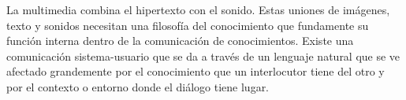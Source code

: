 La multimedia combina el hipertexto con el sonido. Estas uniones de imágenes, texto y sonidos necesitan una filosofía del conocimiento que fundamente su función interna dentro de la comunicación de conocimientos. Existe una comunicación sistema-usuario que se da a través de un lenguaje natural que se ve afectado grandemente por el conocimiento que un interlocutor tiene del otro y por el contexto o entorno donde el diálogo tiene lugar. 